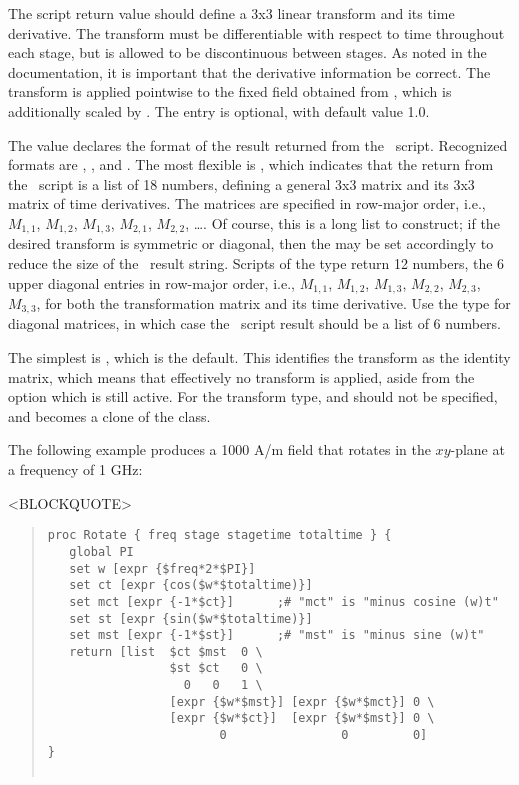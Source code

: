 \begin{description}
   The script return value should define a 3x3 linear transform and its
   time derivative.  The transform must be differentiable with respect
   to time throughout each stage, but is allowed to be discontinuous
   between stages.  As noted in the 
   documentation, it is important that the derivative information be
   correct.  The transform is applied pointwise to the fixed
   field obtained from , which is
   additionally scaled by .  The
    entry is optional, with default value 1.0.

   The   value declares the
   format of the result returned from the \Tcl\ script.  Recognized
   formats are , ,  and
   .  The most flexible is , which indicates
   that the return from the \Tcl\ script is a list of 18 numbers,
   defining a general 3x3 matrix and its 3x3 matrix of time derivatives.
   The matrices are specified in row-major order, i.e., $M_{1,1}$,
   $M_{1,2}$, $M_{1,3}$, $M_{2,1}$, $M_{2,2}$, \ldots.  Of course, this
   is a long list to construct; if the desired transform is symmetric or
   diagonal, then the  may be set accordingly to reduce the
   size of the \Tcl\ result string.  Scripts of the  type
   return 12 numbers, the 6 upper diagonal entries in row-major order,
   i.e., $M_{1,1}$, $M_{1,2}$, $M_{1,3}$, $M_{2,2}$, $M_{2,3}$,
   $M_{3,3}$, for both the transformation matrix and its time
   derivative.  Use the  type for diagonal matrices, in
   which case the \Tcl\ script result should be a list of 6 numbers.

   The simplest  is , which is the
   default.  This identifies the transform as the identity matrix, which
   means that effectively no transform is applied, aside from the
    option which is still active.  For the 
   transform type,  and  should not be
   specified, and  becomes a clone of the
    class.

   The following example produces a 1000 A/m field that rotates in the
   $xy$-plane at a frequency of 1 GHz:
\begin{rawhtml}
<BLOCKQUOTE>
\end{rawhtml}
\begin{quote}
\begin{verbatim}
proc Rotate { freq stage stagetime totaltime } {
   global PI
   set w [expr {$freq*2*$PI}]
   set ct [expr {cos($w*$totaltime)}]
   set mct [expr {-1*$ct}]      ;# "mct" is "minus cosine (w)t"
   set st [expr {sin($w*$totaltime)}]
   set mst [expr {-1*$st}]      ;# "mst" is "minus sine (w)t"
   return [list  $ct $mst  0 \
                 $st $ct   0 \
                   0   0   1 \
                 [expr {$w*$mst}] [expr {$w*$mct}] 0 \
                 [expr {$w*$ct}]  [expr {$w*$mst}] 0 \
                        0                0         0]
}


\end{verbatim}
\end{quote}
\end{description}
